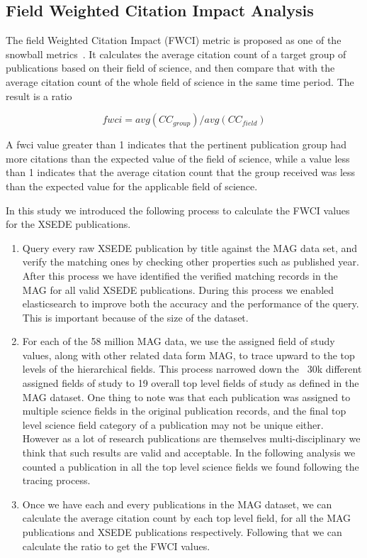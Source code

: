 \documentclass{sig-alternate}
\begin{document}
\subsection{Field Weighted Citation Impact Analysis}

The field Weighted Citation Impact (FWCI) metric is proposed as one of
the snowball metrics~\cite{colledge2014snowball}. It calculates the
average citation count of a target group of publications based on
their field of science, and then compare that with the average
citation count of the whole field of science in the same time
period. The result is a ratio

\[ fwci = avg(CC_{group})/avg(CC_{field}) \]

A fwci value greater than 1 indicates that the pertinent publication
group had more citations than the expected value of the field of
science, while a value less than 1 indicates that the average citation
count that the group received was less than the expected value for the
applicable field of science.

In this study we introduced the following process to calculate the FWCI
values for the XSEDE publications.

\begin{enumerate}
\item Query every raw XSEDE publication by title against the MAG data
  set, and verify the matching ones by checking other properties such
  as published year. After this process we have identified the
  verified matching records in the MAG for all valid XSEDE
  publications.  During this process we enabled elasticsearch \cite{gormley2015elasticsearch} to
  improve both the accuracy and the performance of the query.  This is
  important because of the size of the dataset.
\item For each of the 58 million MAG data, we use the assigned field
  of study values, along with other related data form MAG, to trace
  upward to the top levels of the hierarchical fields. This process
  narrowed down the ~30k different assigned fields of study to 19
  overall top level fields of study as defined in the MAG dataset.
  One thing to note was that each publication was assigned to multiple
  science fields in the original publication records, and the final
  top level science field category of a publication may not be unique
  either. However as a lot of research publications are themselves
  multi-disciplinary we think that such results are valid and
  acceptable. In the following analysis we counted a publication in
  all the top level science fields we found following the tracing
  process.
\item Once we have each and every publications in the MAG dataset, we
  can calculate the average citation count by each top level field,
  for all the MAG publications and XSEDE publications
  respectively. Following that we can calculate the ratio to get the
  FWCI values.
\end{enumerate}
\end{document}
